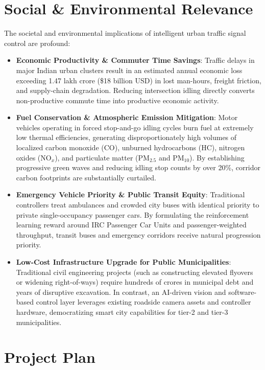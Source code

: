 \section{Social \& Environmental Relevance}
\label{sec:social_env}
The societal and environmental implications of intelligent urban traffic signal control are profound:
\begin{itemize}
    \item \textbf{Economic Productivity \& Commuter Time Savings}: Traffic delays in major Indian urban clusters result in an estimated annual economic loss exceeding 1.47 lakh crore (\$18 billion USD) in lost man-hours, freight friction, and supply-chain degradation. Reducing intersection idling directly converts non-productive commute time into productive economic activity.
    \item \textbf{Fuel Conservation \& Atmospheric Emission Mitigation}: Motor vehicles operating in forced stop-and-go idling cycles burn fuel at extremely low thermal efficiencies, generating disproportionately high volumes of localized carbon monoxide (CO), unburned hydrocarbons (HC), nitrogen oxides ($\text{NO}_x$), and particulate matter ($\text{PM}_{2.5}$ and $\text{PM}_{10}$). By establishing progressive green waves and reducing idling stop counts by over 20\%, corridor carbon footprints are substantially curtailed.
    \item \textbf{Emergency Vehicle Priority \& Public Transit Equity}: Traditional controllers treat ambulances and crowded city buses with identical priority to private single-occupancy passenger cars. By formulating the reinforcement learning reward around IRC Passenger Car Units and passenger-weighted throughput, transit buses and emergency corridors receive natural progression priority.
    \item \textbf{Low-Cost Infrastructure Upgrade for Public Municipalities}: Traditional civil engineering projects (such as constructing elevated flyovers or widening right-of-ways) require hundreds of crores in municipal debt and years of disruptive excavation. In contrast, an AI-driven vision and software-based control layer leverages existing roadside camera assets and controller hardware, democratizing smart city capabilities for tier-2 and tier-3 municipalities.
\end{itemize}

\section{Project Plan}
\label{sec:project_plan}

